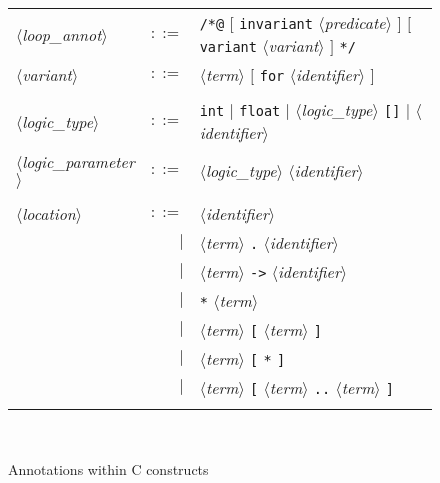 \documentclass[a4paper,12pt]{report}
\newcommand{\te}[1]{\texttt{#1}}
\newcommand{\nt}[1]{$\langle$\textsl{#1}$\rangle$}
\begin{document}
\begin{figure}[htbp]
\begin{center}
\begin{tabular}{lrl}
  \nt{loop\_annot}
    & $::=$ & \te{/*@} $[$ \te{invariant} \nt{predicate} $]$
              $[$ \te{variant} \nt{variant} $]$ \te{*/}  \\
  \nt{variant} 
    & $::=$ & \nt{term} $[$ \te{for} \nt{identifier} $]$ \\

  \\[0.1em]
  
  \nt{logic\_type}
    & $::=$ & \te{int} $|$ \te{float} $|$ \nt{logic\_type} \te{[]} 
            $|$ \nt{identifier} \\
  \nt{logic\_parameter}
    & $::=$ & \nt{logic\_type} \nt{identifier} \\

  \\[0.1em]

  \nt{location}
    & $::=$ & \nt{identifier} \\
    &   $|$ & \nt{term} \te{.} \nt{identifier} \\
    &   $|$ & \nt{term} \te{->} \nt{identifier} \\
    &   $|$ & \te{*} \nt{term} \\
    &   $|$ & \nt{term} \te{[} \nt{term} \te{]} \\
    &   $|$ & \nt{term} \te{[} \te{*} \te{]} \\
    &   $|$ & \nt{term} \te{[} \nt{term} \te{..} \nt{term} \te{]} \\
  \\[0.1em]
\end{tabular}\\
\hrulefill
\caption{Annotations within C constructs}
\label{fig:cfiles}
\end{center}           
\end{figure}
\end{document}
